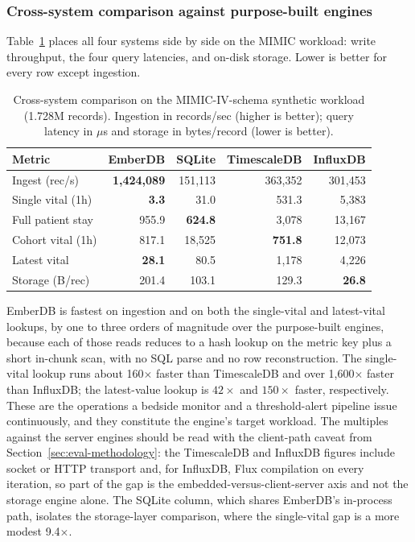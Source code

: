 \documentclass[journal]{IEEEtran}
\begin{document}
\subsubsection{Cross-system comparison against purpose-built engines}
Table~\ref{tab:head2head} places all four systems side by side on the MIMIC workload: write throughput, the four query latencies, and on-disk storage. Lower is better for every row except ingestion.

\begin{table}[htbp]
\centering
\caption{Cross-system comparison on the MIMIC-IV-schema synthetic workload (1.728M records). Ingestion in records/sec (higher is better); query latency in $\mu$s and storage in bytes/record (lower is better).}
\label{tab:head2head}
\setlength{\tabcolsep}{4pt}
\begin{tabular}{lrrrr}
\toprule
\textbf{Metric} & \textbf{EmberDB} & \textbf{SQLite} & \textbf{TimescaleDB} & \textbf{InfluxDB} \\
\midrule
Ingest (rec/s) & \textbf{1{,}424{,}089} & 151{,}113 & 363{,}352 & 301{,}453 \\
\midrule
Single vital (1h) & \textbf{3.3} & 31.0 & 531.3 & 5{,}383 \\
Full patient stay & 955.9 & \textbf{624.8} & 3{,}078 & 13{,}167 \\
Cohort vital (1h) & 817.1 & 18{,}525 & \textbf{751.8} & 12{,}073 \\
Latest vital & \textbf{28.1} & 80.5 & 1{,}178 & 4{,}226 \\
\midrule
Storage (B/rec) & 201.4 & 103.1 & 129.3 & \textbf{26.8} \\
\bottomrule
\end{tabular}
\end{table}

EmberDB is fastest on ingestion and on both the single-vital and latest-vital lookups, by one to three orders of magnitude over the purpose-built engines, because each of those reads reduces to a hash lookup on the metric key plus a short in-chunk scan, with no SQL parse and no row reconstruction. The single-vital lookup runs about 160$\times$ faster than TimescaleDB and over 1{,}600$\times$ faster than InfluxDB; the latest-value lookup is $42\times$ and $150\times$ faster, respectively. These are the operations a bedside monitor and a threshold-alert pipeline issue continuously, and they constitute the engine's target workload. The multiples against the server engines should be read with the client-path caveat from Section~\ref{sec:eval-methodology}: the TimescaleDB and InfluxDB figures include socket or HTTP transport and, for InfluxDB, Flux compilation on every iteration, so part of the gap is the embedded-versus-client-server axis and not the storage engine alone. The SQLite column, which shares EmberDB's in-process path, isolates the storage-layer comparison, where the single-vital gap is a more modest 9.4$\times$.
\end{document}
